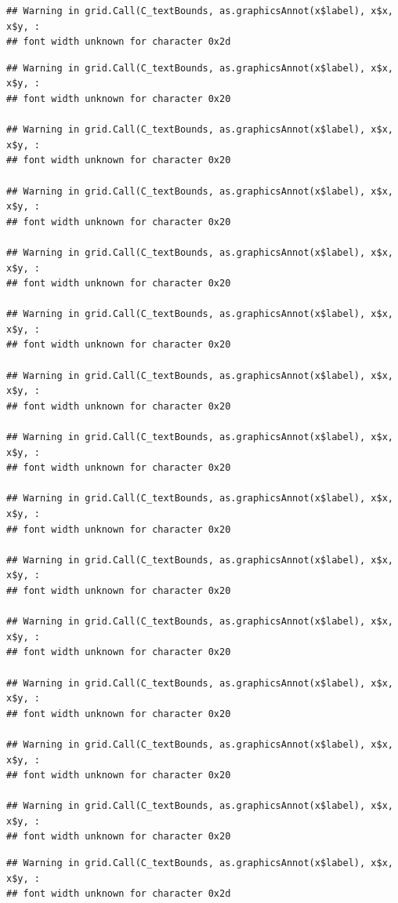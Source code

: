 \documentclass[]{article}
\theoremstyle{definition}
\theoremstyle{definition}
\theoremstyle{definition}
\theoremstyle{remark}
\begin{document}
\begin{verbatim}
## Warning in grid.Call(C_textBounds, as.graphicsAnnot(x$label), x$x, x$y, :
## font width unknown for character 0x2d
\end{verbatim}

\begin{verbatim}
## Warning in grid.Call(C_textBounds, as.graphicsAnnot(x$label), x$x, x$y, :
## font width unknown for character 0x20

## Warning in grid.Call(C_textBounds, as.graphicsAnnot(x$label), x$x, x$y, :
## font width unknown for character 0x20

## Warning in grid.Call(C_textBounds, as.graphicsAnnot(x$label), x$x, x$y, :
## font width unknown for character 0x20

## Warning in grid.Call(C_textBounds, as.graphicsAnnot(x$label), x$x, x$y, :
## font width unknown for character 0x20

## Warning in grid.Call(C_textBounds, as.graphicsAnnot(x$label), x$x, x$y, :
## font width unknown for character 0x20

## Warning in grid.Call(C_textBounds, as.graphicsAnnot(x$label), x$x, x$y, :
## font width unknown for character 0x20

## Warning in grid.Call(C_textBounds, as.graphicsAnnot(x$label), x$x, x$y, :
## font width unknown for character 0x20

## Warning in grid.Call(C_textBounds, as.graphicsAnnot(x$label), x$x, x$y, :
## font width unknown for character 0x20

## Warning in grid.Call(C_textBounds, as.graphicsAnnot(x$label), x$x, x$y, :
## font width unknown for character 0x20

## Warning in grid.Call(C_textBounds, as.graphicsAnnot(x$label), x$x, x$y, :
## font width unknown for character 0x20

## Warning in grid.Call(C_textBounds, as.graphicsAnnot(x$label), x$x, x$y, :
## font width unknown for character 0x20

## Warning in grid.Call(C_textBounds, as.graphicsAnnot(x$label), x$x, x$y, :
## font width unknown for character 0x20

## Warning in grid.Call(C_textBounds, as.graphicsAnnot(x$label), x$x, x$y, :
## font width unknown for character 0x20
\end{verbatim}

\begin{verbatim}
## Warning in grid.Call(C_textBounds, as.graphicsAnnot(x$label), x$x, x$y, :
## font width unknown for character 0x2d
\end{verbatim}
\end{document}
